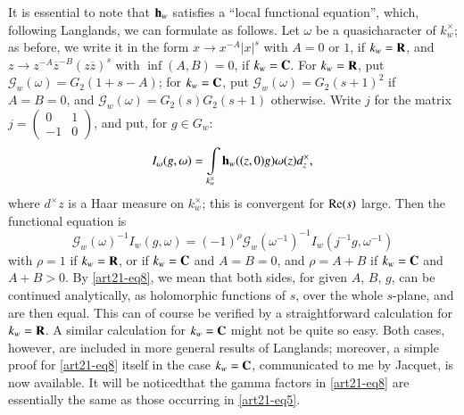 It is essential to note that $\mathbf{h}_{w}$ satisfies a ``local functional equation'', which, following Langlands, we can formulate as follows. Let $\omega$ be a quasicharacter of $k^{\times}_{w}$; as before, we write it in the form $x\to x^{-A}|x|^{s}$ with $A=0$ or $1$, if $k_{w}=\mathbf{R}$, and $z\to z^{-A}\overline{z}^{-B}(z\overline{z})^{s}$ with $\inf(A,B)=0$, if $k_{w}=\mathbf{C}$. For $k_{w}=\mathbf{R}$, put $\mathscr{G}_{w}(\omega)=G_{2}(1+s-A)$; for $k_{w}=\mathbf{C}$, put $\mathscr{G}_{w}(\omega)=G_{2}(s+1)^{2}$ if $A=B=0$, and $\mathscr{G}_{w}(\omega)=G_{2}(s)G_{2}(s+1)$ otherwise. Write $j$ for the matrix $j=\left(\begin{smallmatrix} 0 & 1\\ -1 & 0\end{smallmatrix}\right)$, and put, for $g\in G_{w}$:
\begin{equation}
I_{\omega}(g,\omega)=\int\limits_{k^{\times}_{w}}\mathbf{h}_{w}((z,0)g)\omega(z)d^{\times}_{z},\label{art21-eq7}
\end{equation}
where $d^{\times}z$ is a Haar measure on $k^{\times}_{w}$; this is convergent for $\operatorname{\mathrm{Re}}(s)$ large. Then the functional equation is
\begin{equation}
\mathscr{G}_{w}(\omega)^{-1}I_{w}(g,\omega)=(-1)^{\rho}\mathscr{G}_{w}(\omega^{-1})^{-1}I_{w}(j^{-1}g,\omega^{-1})\label{art21-eq8}
\end{equation}
with $\rho=1$ if $k_{w}=\mathbf{R}$, or if $k_{w}=\mathbf{C}$ and $A=B=0$, and $\rho=A+B$ if $k_{w}=\mathbf{C}$ and $A+B>0$. By \eqref{art21-eq8}, we mean that both sides, for given $A$, $B$, $g$, can be continued analytically, as holomorphic functions of $s$, over the whole $s$-plane, and are then equal. This can of course be verified by a straightforward calculation for $k_{w}=\mathbf{R}$. A similar calculation for $k_{w}=\mathbf{C}$ might not be quite so easy. Both cases, however, are included in more general results of Langlands; moreover, a simple proof for \eqref{art21-eq8} itself in the case $k_{w}=\mathbf{C}$, communicated to me by Jacquet, is now available. It will be noticed\pageoriginale that the gamma factors in \eqref{art21-eq8} are essentially the same as those occurring in \eqref{art21-eq5}.

